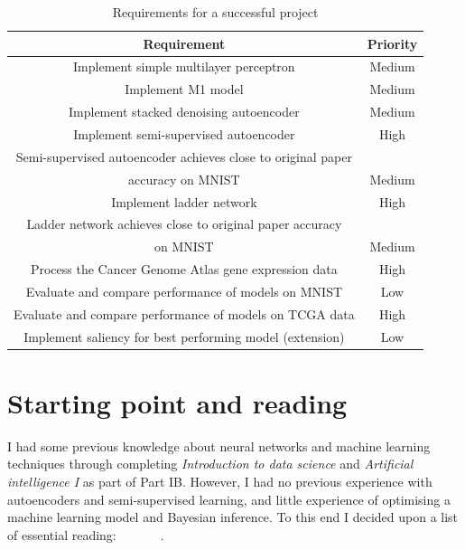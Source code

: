 \begin{table}[H]
  \label{tab:requirements}
  \small %
  \centering %
  \begin{tabular}{cc} %
  \toprule[\heavyrulewidth]\toprule[\heavyrulewidth]
  \textbf{Requirement} & \textbf{Priority} \\ 
  \midrule
  Implement simple multilayer perceptron & Medium \\
  Implement M1 model & Medium \\
  Implement stacked denoising autoencoder & Medium \\
  Implement semi-supervised autoencoder & High \\
  Semi-supervised autoencoder achieves close to original paper \\ accuracy on MNIST & Medium \\
  Implement ladder network & High \\
  Ladder network achieves close to original paper accuracy \\ on MNIST & Medium \\
  Process the Cancer Genome Atlas gene expression data & High \\
  Evaluate and compare performance of models on MNIST & Low \\
  Evaluate and compare performance of models on TCGA data & High \\
  Implement saliency for best performing model (extension) & Low \\
  \bottomrule[\heavyrulewidth] 
  \end{tabular}
  \caption{Requirements for a successful project} 
\end{table}

\section{Starting point and reading} \label{reading}

I had some previous knowledge about neural networks and machine learning techniques through completing \textit{Introduction to data science}
and \textit{Artificial intelligence I} as part of Part IB. However,
I had no previous experience with autoencoders and semi-supervised learning, and little experience of optimising 
a machine learning model and Bayesian inference. To this end I decided upon a list of essential reading:~\cite{ML_Bayes}~\cite{Goodfellow-et-al-2016}~\cite{DBLP:journals/corr/KingmaW13}~\cite{DBLP:journals/corr/KingmaRMW14}~\cite{Vincent:2010:SDA:1756006.1953039}~\cite{DBLP:journals/corr/Valpola14}~\cite{DBLP:journals/corr/RasmusVHBR15}.


